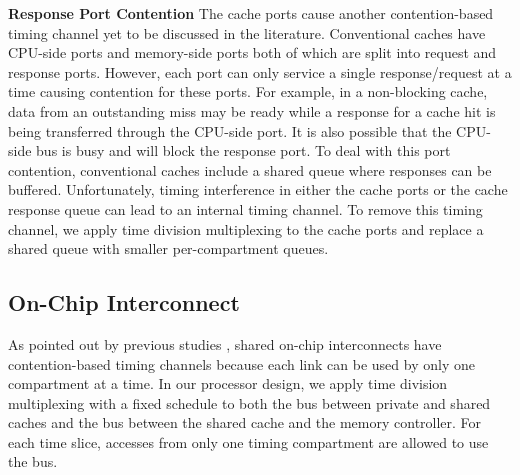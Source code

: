 \textbf{Response Port Contention}
The cache ports cause another contention-based timing channel yet to be 
discussed in the literature. Conventional caches have CPU-side ports and 
memory-side ports both of which are split into request and response ports. 
However, each port can only service a single response/request at a time
causing contention for these ports. For example, in a non-blocking cache,
data from an outstanding miss may be ready while a response for a cache hit
is being transferred through the CPU-side port.
It is also possible that the CPU-side bus is busy and will block the response
port. 
To deal with this port contention, conventional caches include a shared queue
where responses can be buffered. Unfortunately, 
timing interference in either the cache ports or the cache response queue can
lead to an internal timing channel. To remove this timing channel, we apply
time division multiplexing to the cache ports and replace a shared queue with
smaller per-compartment queues.

\subsection{On-Chip Interconnect}

As pointed out by previous studies \cite{yaonocs, surfnoc}, shared on-chip 
interconnects
have contention-based timing channels because each link can be used by only 
one compartment at a time. In our processor design, we apply time
division multiplexing with a fixed schedule to both the bus between private
and shared caches and the bus between the shared cache and the memory controller.
For each time slice, accesses from only one timing compartment are allowed to
use the bus.

